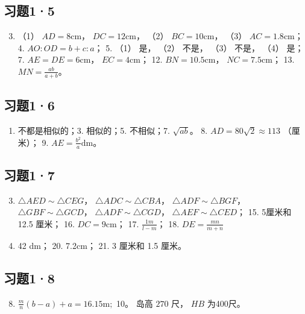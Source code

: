 \subsection{习题1·5}

\begin{enumerate}
\setcounter{enumi}{2}
\item
  （1） \(AD = 8\mathrm{cm}\)， \(DC = 12\mathrm{cm}\)， （2）
  \(BC = 10\mathrm{cm}\)， （3） \(AC = 1.8\mathrm{cm}\)； 4.
  \(AO:OD = b + c:a\)； 5. （1） 是， （2） 不是， （3） 不是， （4）
  是； 7. \(AE = DE = 6\mathrm{cm}\)， \(EC = 4\mathrm{cm}\)； 12.
  \(BN = 10.5\mathrm{cm}\)， \(NC = 7.5\mathrm{cm}\)； 13.
  \(MN = \frac{ab}{a + b}\)。
\end{enumerate}

\subsection{习题1·6}

\begin{enumerate}
\item
  不都是相似的；3. 相似的；5. 不相似；7. \(\sqrt{ab}\)。 8.
  \(AD = 80\sqrt{2} \approx 113\) （厘米）； 9.
  \(AE = \frac{b^2}{a} \mathrm{dm}\)。
\end{enumerate}

\subsection{习题1·7}

\begin{enumerate}
\setcounter{enumi}{2}
\item
  \(\triangle AED \sim \triangle CEG\)，
  \(\triangle ADC \sim \triangle CBA\)，
  \(\triangle ADF \sim \triangle BGF\)，
  \(\triangle GBF \sim \triangle GCD\)，
  \(\triangle ADF \sim \triangle CGD\)，
  \(\triangle AEF \sim \triangle CED\)； 15. 5厘米和 12.5 厘米； 16.
  \(DC = 9\mathrm{cm}\)； 17. \(\frac{1m}{l - m}\)； 18.
  \(DE = \frac{mn}{m + n}\)
\item
  42 dm； 20. 7.2cm； 21. 3 厘米和 1.5 厘米。
\end{enumerate}

\subsection{习题1·8}

\begin{enumerate}
\setcounter{enumi}{7}
\item
  \(\frac{m}{n} (b - a) + a = 16.15\mathrm{m};\) 10。 岛高 \(270\) 尺，
  \(HB\) 为400尺。
\end{enumerate}

